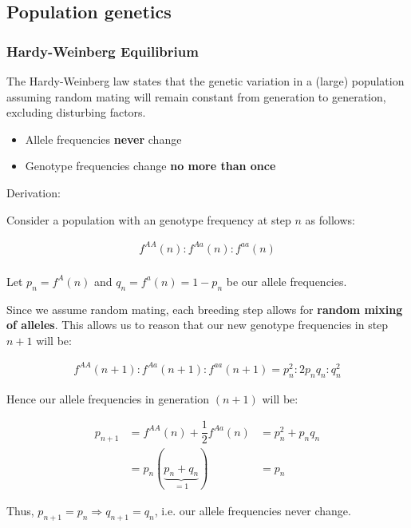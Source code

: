 \documentclass[11pt]{article}
\providecommand{\tightlist}{%
      \setlength{\itemsep}{0pt}\setlength{\parskip}{0pt}}
\begin{document}
    \subsection{Population genetics}\label{population-genetics}

\subsubsection{Hardy-Weinberg
Equilibrium}\label{hardy-weinberg-equilibrium}

The Hardy-Weinberg law states that the genetic variation in a (large)
population assuming random mating will remain constant from generation
to generation, excluding disturbing factors.

\begin{itemize}
\tightlist
\item
  Allele frequencies \textbf{never} change
\item
  Genotype frequencies change \textbf{no more than once}
\end{itemize}

Derivation:

Consider a population with an genotype frequency at step \(n\) as
follows:

\begin{align*}
f^{AA}(n) : f^{Aa}(n) : f^{aa}(n)\\
\end{align*}

Let \(p_n = f^{A}(n)\) and \(q_n = f^{a}(n) = 1-p_n\) be our allele
frequencies.

Since we assume random mating, each breeding step allows for
\textbf{random mixing of alleles}. This allows us to reason that our new
genotype frequencies in step \(n+1\) will be:

\begin{align*}
    f^{AA}(n+1) : f^{Aa}(n+1) : f^{aa}(n+1) = p_n^2 : 2p_nq_n : q_n^2
\end{align*}

Hence our allele frequencies in generation \((n+1)\) will be:

\begin{align*}
    p_{n+1} &= f^{AA}(n) + \dfrac{1}{2}f^{Aa}(n)
            &= p_n^2 + p_nq_n\\
            &= p_n(\underbrace{p_n + q_n}_{ = 1})
            &= p_n
\end{align*}

Thus, \(p_{n+1} = p_n \Rightarrow q_{n+1} = q_n\), i.e. our allele
frequencies never change.
\end{document}
